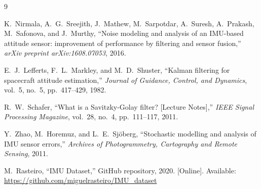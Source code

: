 \documentclass[12pt,a4paper]{article}
\begin{document}

\begin{thebibliography}{9}

K.\ Nirmala, A.\ G.\ Sreejith, J.\ Mathew, M.\ Sarpotdar, A.\ Suresh, A.\ Prakash, M.\ Safonova, and J.\ Murthy,
``Noise modeling and analysis of an IMU-based attitude sensor: improvement of performance by filtering and sensor fusion,''
\textit{arXiv preprint arXiv:1608.07053}, 2016.

E.\ J.\ Lefferts, F.\ L.\ Markley, and M.\ D.\ Shuster,
``Kalman filtering for spacecraft attitude estimation,''
\textit{Journal of Guidance, Control, and Dynamics}, vol.\ 5, no.\ 5, pp.\ 417--429, 1982.

R.\ W.\ Schafer,
``What is a Savitzky-Golay filter? [Lecture Notes],''
\textit{IEEE Signal Processing Magazine}, vol.\ 28, no.\ 4, pp.\ 111--117, 2011.

Y.\ Zhao, M.\ Horemuz, and L.\ E.\ Sj\"{o}berg,
``Stochastic modelling and analysis of IMU sensor errors,''
\textit{Archives of Photogrammetry, Cartography and Remote Sensing}, 2011.

M.\ Rasteiro,
``IMU Dataset,''
GitHub repository, 2020.
[Online]. Available: \url{https://github.com/miguelrasteiro/IMU_dataset}

\end{thebibliography}
\end{document}
